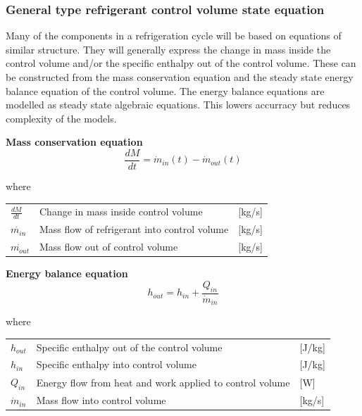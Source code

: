 \subsubsection{General type refrigerant control volume state equation}
Many of the components in a refrigeration cycle will be based on equations of similar structure. They will generally express the change in mass inside the control volume and/or the specific enthalpy out of the control volume. These can be constructed from the mass conservation equation and the steady state energy balance equation of the control volume. The energy balance equations are modelled as steady state algebraic equations. This lowers accurracy but reduces complexity of the models.

\textbf{Mass conservation equation} \\
\begin{equation} \label{eq:GeneralTypeControlVol_MassConservation}
	\frac{dM}{dt} = \dot{m}_{in}(t) - \dot{m}_{out}(t)
\end{equation}

where
\begin{center}
	\begin{tabular}{l p{8cm} l}
		$\frac{dM}{dt}$ 	& Change in mass inside control volume & [\si{kg}/\si{s}]\\
		$\dot{m_{in}}$ 		& Mass flow of refrigerant into control volume & [\si{kg}/\si{s}]\\
		$\dot{m_{out}}$ 	& Mass flow out of control volume & [\si{kg}/\si{s}]\\
	\end{tabular}
\end{center}

\textbf{Energy balance equation}
\begin{equation}
	h_{out} = h_{in} + \frac{Q_{in}}{\dot{m}_{in}}
\end{equation}

where
\begin{center}
	\begin{tabular}{l p{8cm} l}
		$h_{out}$ 		& Specific enthalpy out of the control volume & [\si{J}/\si{kg}]\\
		$h_{in}$ 		& Specific enthalpy into control volume & [\si{J}/\si{kg}]\\
		$Q_{in}$ 		& Energy flow from heat and work applied to control volume & [\si{W}]\\
		$\dot{m}_{in}$ 	& Mass flow into control volume & [\si{kg}/\si{s}]\\
	\end{tabular}
\end{center}

